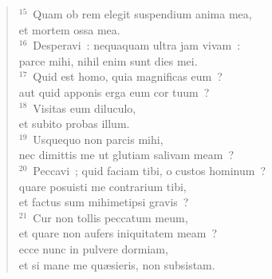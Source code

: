 \begin{flushleft}
\begin{verse}
${}^{15}$~Quam ob rem elegit suspendium anima mea,\\ et mortem ossa mea.\\
${}^{16}$~Desperavi~: nequaquam ultra jam vivam~:\\ parce mihi, nihil enim sunt dies mei.\\
${}^{17}$~Quid est homo, quia magnificas eum~?\\ aut quid apponis erga eum cor tuum~?\\
${}^{18}$~Visitas eum diluculo,\\ et subito probas illum.\\
${}^{19}$~Usquequo non parcis mihi,\\ nec dimittis me ut glutiam salivam meam~?\\
${}^{20}$~Peccavi~; quid faciam tibi, o custos hominum~?\\ quare posuisti me contrarium tibi,\\ et factus sum mihimetipsi gravis~?\\
${}^{21}$~Cur non tollis peccatum meum,\\ et quare non aufers iniquitatem meam~?\\ ecce nunc in pulvere dormiam,\\ et si mane me qu\ae sieris, non subsistam.\end{verse}\end{flushleft}



